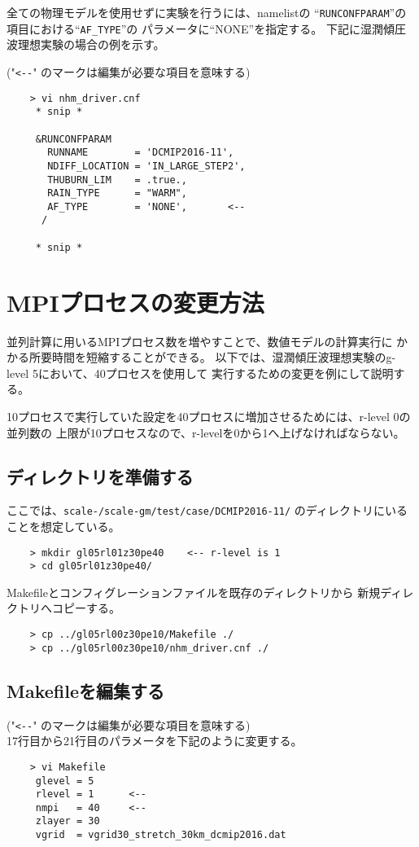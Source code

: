  \noindent 全ての物理モデルを使用せずに実験を行うには、namelistの
``\verb|RUNCONFPARAM|''の項目における``\verb|AF_TYPE|''の
パラメータに``NONE''を指定する。
下記に湿潤傾圧波理想実験の場合の例を示す。


 ("\verb|<--|" のマークは編集が必要な項目を意味する)
 \begin{verbatim}
    > vi nhm_driver.cnf
     * snip *

     &RUNCONFPARAM
       RUNNAME        = 'DCMIP2016-11',
       NDIFF_LOCATION = 'IN_LARGE_STEP2',
       THUBURN_LIM    = .true.,
       RAIN_TYPE      = "WARM",
       AF_TYPE        = 'NONE',       <--
      /

     * snip *
 \end{verbatim}



\section{MPIプロセスの変更方法}
 \noindent 並列計算に用いるMPIプロセス数を増やすことで、数値モデルの計算実行に
かかる所要時間を短縮することができる。
以下では、湿潤傾圧波理想実験のg-level 5において、40プロセスを使用して
実行するための変更を例にして説明する。

10プロセスで実行していた設定を40プロセスに増加させるためには、r-level 0の並列数の
上限が10プロセスなので、r-levelを0から1へ上げなければならない。

\subsection{ディレクトリを準備する}
 ここでは、\texttt{scale-{\version}/scale-gm/test/case/DCMIP2016-11/} のディレクトリにいることを想定している。
 \begin{verbatim}
    > mkdir gl05rl01z30pe40    <-- r-level is 1
    > cd gl05rl01z30pe40/
 \end{verbatim}

 \noindent Makefileとコンフィグレーションファイルを既存のディレクトリから
新規ディレクトリへコピーする。
 \begin{verbatim}
    > cp ../gl05rl00z30pe10/Makefile ./
    > cp ../gl05rl00z30pe10/nhm_driver.cnf ./
 \end{verbatim}

\subsection{Makefileを編集する}
 ("\verb|<--|" のマークは編集が必要な項目を意味する) \\
 17行目から21行目のパラメータを下記のように変更する。
 \begin{verbatim}
    > vi Makefile
     glevel = 5
     rlevel = 1      <--
     nmpi   = 40     <--
     zlayer = 30
     vgrid  = vgrid30_stretch_30km_dcmip2016.dat
 \end{verbatim}


